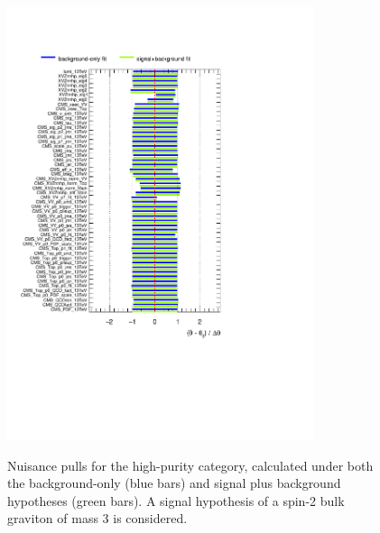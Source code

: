 \begin{figure}[!h]
   \caption{Nuisance pulls for the high-purity category, calculated under both the background-only (blue bars) and signal plus background hypotheses (green bars). A signal hypothesis of a spin-2 bulk graviton of mass 3 \TeV is considered.}
 \begin{center}
   \includegraphics[width=0.8\textwidth]{pulls_VZ_data_1fb/pulls_XZZInv_hp3000.pdf}
   \label{fig:pulls_hp}
 \end{center}
\end{figure}


